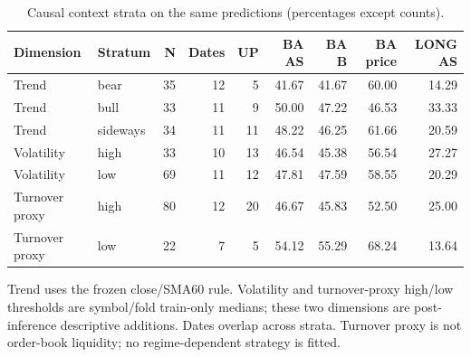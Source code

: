 \begin{table}[htbp]
\centering\small
\caption{Causal context strata on the same predictions (percentages except counts).}
\label{tab:r2_regimes}
\setlength{\tabcolsep}{3.5pt}
\begin{tabular}{llrrrrrrr}
\hline
Dimension & Stratum & N & Dates & UP & BA AS & BA B & BA price & LONG AS \\
\hline
Trend & bear & 35 & 12 & 5 & 41.67 & 41.67 & 60.00 & 14.29 \\
Trend & bull & 33 & 11 & 9 & 50.00 & 47.22 & 46.53 & 33.33 \\
Trend & sideways & 34 & 11 & 11 & 48.22 & 46.25 & 61.66 & 20.59 \\
Volatility & high & 33 & 10 & 13 & 46.54 & 45.38 & 56.54 & 27.27 \\
Volatility & low & 69 & 11 & 12 & 47.81 & 47.59 & 58.55 & 20.29 \\
Turnover proxy & high & 80 & 12 & 20 & 46.67 & 45.83 & 52.50 & 25.00 \\
Turnover proxy & low & 22 & 7 & 5 & 54.12 & 55.29 & 68.24 & 13.64 \\
\hline
\end{tabular}
\par\smallskip\footnotesize Trend uses the frozen close/SMA60 rule. Volatility and turnover-proxy high/low thresholds are symbol/fold train-only medians; these two dimensions are post-inference descriptive additions. Dates overlap across strata. Turnover proxy is not order-book liquidity; no regime-dependent strategy is fitted.
\end{table}
